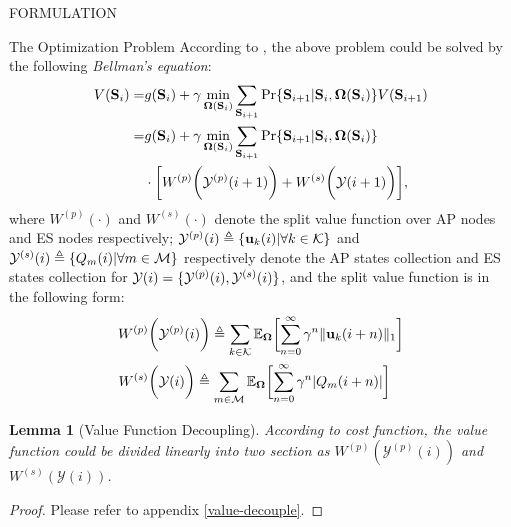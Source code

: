 \documentclass[10pt, conference, letterpaper]{IEEEtran}
\newtheorem{lemma}{Lemma}
\newcommand{\define}{\triangleq}
\renewcommand{\vec}{\mathbf}
\DeclarePairedDelimiter{\set}{\{}{\}}
\DeclarePairedDelimiter{\Inorm}{\|}{\|_1}
\DeclarePairedDelimiter{\Paren}{\bigg(}{\bigg)}
\DeclarePairedDelimiter{\Bracket}{\bigg[}{\bigg]}
\newcommand{\apSet}{\mathcal{K}}
\newcommand{\esSet}{\mathcal{M}}
\newcommand{\Stat}{\mathbf{S}}
\newcommand{\Obsv}{\mathcal{Y}}
\newcommand{\Policy}{\mathbf{\Omega}}
\begin{document}
\begin{section}{FORMULATION}
\begin{subsection}{The Optimization Problem}
            According to \cite{sutton1998introduction}, the above problem could be solved by the following \emph{Bellman's equation}:
            \begin{align}
                V(\Stat_{i}) =& g(\Stat_i) + \gamma \min_{\Policy(\Stat_{i})} \sum_{\Stat_{i+1}} \Pr\{ \Stat_{i+1}|\Stat_{i}, \Policy(\Stat_{i}) \} V(\Stat_{i+1})
                \nonumber\\
                =& g(\Stat_{i}) + \gamma \min_{\Policy(\Stat_{i})} \sum_{\Stat_{i+1}} \Pr\{ \Stat_{i+1}|\Stat_{i}, \Policy(\Stat_{i}) \}
                    \nonumber\\
                    & \cdot \Bracket{ W^{(p)}\Paren{\Obsv^{(p)}(i+1)} + W^{(s)}\Paren{\Obsv(i+1)} },
            \end{align}
            where $W^{(p)}(\cdot)$ and $W^{(s)}(\cdot)$ denote the split value function over AP nodes and ES nodes respectively; $\Obsv^{(p)}(i) \define \set{\vec{u}_k(i)|\forall k\in\apSet}$ and $\Obsv^{(s)}(i) \define \set{Q_m(i)|\forall m\in\esSet}$ respectively denote the AP states collection and ES states collection for $\Obsv(i) = \set{\Obsv^{(p)}(i), \Obsv^{(s)}(i)}$, and the split value function is in the following form:
            \begin{align}
                W^{(p)}&\Paren{\Obsv^{(p)}(i)} \define \sum_{k\in\apSet}
                    \mathbb{E}_{\Policy}\Bracket{\sum_{n=0}^{\infty} \gamma^{n} \Inorm{\vec{u}_k(i+n)}}
                \\
                W^{(s)}&\Paren{\Obsv(i)} \define \sum_{m\in\esSet}
                    \mathbb{E}_{\Policy}\Bracket{\sum_{n=0}^{\infty} \gamma^{n} |Q_m(i+n)|}
            \end{align}

            \begin{lemma}[Value Function Decoupling]
                According to cost function, the value function could be divided linearly into two section as $ W^{(p)}(\Obsv^{(p)}(i))$ and $W^{(s)}(\Obsv(i))$.
            \end{lemma}
            \begin{proof}
                Please refer to appendix \ref{value-decouple}.
            \end{proof}


\end{subsection}
\end{section}
\end{document}
